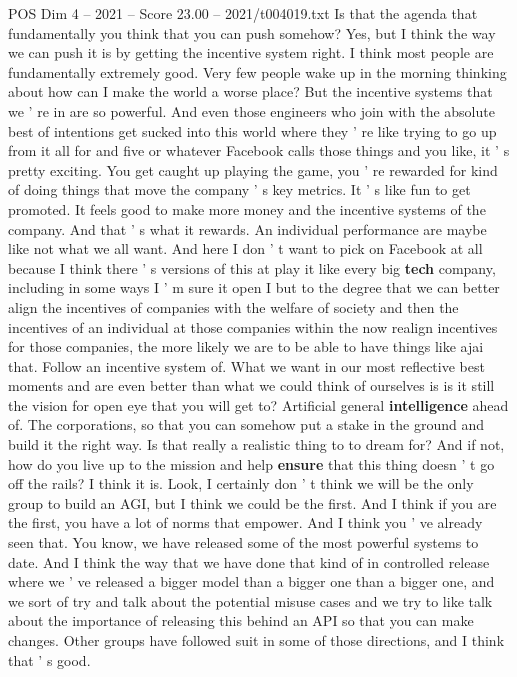 \begin{textsample}{POS Dim 4 – 2021 – Score 23.00 – 2021/t004019.txt}
Is that the agenda that fundamentally you think that you can push somehow?
Yes, but I think the way we can push it is by getting the incentive system right.
I think most people are fundamentally extremely good.
Very few people wake up in the morning thinking about how can I make the world a worse place?
But the incentive systems that we ' re in are so powerful.
And even those engineers who join with the absolute best of intentions get sucked into this world where they ' re like trying to go up from it all for and five or whatever Facebook calls those things and you like, it ' s pretty exciting.
You get caught up playing the game, you ' re rewarded for kind of doing things that move the company ' s key metrics.
It ' s like fun to get promoted.
It feels good to make more money and the incentive systems of the company.
And that ' s what it rewards.
An individual performance are maybe like not what we all want.
And here I don ' t want to pick on Facebook at all because I think there ' s versions of this at play it like every big \textbf{tech} company, including in some ways I ' m sure it open I but to the degree that we can better align the incentives of companies with the welfare of society and then the incentives of an individual at those companies within the now realign incentives for those companies, the more likely we are to be able to have things like ajai that.
Follow an incentive system of.
What we want in our most reflective best moments and are even better than what we could think of ourselves is is it still the vision for open eye that you will get to?
Artificial general \textbf{intelligence} ahead of.
The corporations, so that you can somehow put a stake in the ground and build it the right way.
Is that really a realistic thing to to dream for?
And if not, how do you live up to the mission and help \textbf{ensure} that this thing doesn ' t go off the rails?
I think it is.
Look, I certainly don ' t think we will be the only group to build an AGI, but I think we could be the first.
And I think if you are the first, you have a lot of norms that empower.
And I think you ' ve already seen that.
You know, we have released some of the most powerful systems to date.
And I think the way that we have done that kind of in controlled release where we ' ve released a bigger model than a bigger one than a bigger one, and we sort of try and talk about the potential misuse cases and we try to like talk about the importance of releasing this behind an API so that you can make changes.
Other groups have followed suit in some of those directions, and I think that ' s good.

\end{textsample}
